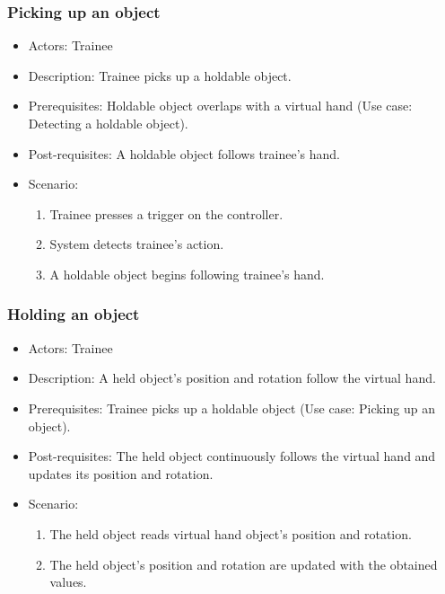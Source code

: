 \subsubsection{Picking up an object}
\begin{itemize}
\item Actors: Trainee
\item Description: Trainee picks up a holdable object.
\item Prerequisites: Holdable object overlaps with a virtual hand (Use case: Detecting a holdable object).
\item Post-requisites: A holdable object follows trainee's hand.
\item Scenario: 
\begin{enumerate}
    \item Trainee presses a trigger on the controller.
    \item System detects trainee's action.
    \item A holdable object begins following trainee's hand.
\end{enumerate}

\end{itemize}
\subsubsection{Holding an object}
\begin{itemize}
\item Actors: Trainee
\item Description: A held object's position and rotation follow the virtual hand.
\item Prerequisites: Trainee picks up a holdable object (Use case: Picking up an object).
\item Post-requisites: The held object continuously follows the virtual hand and updates its position and rotation.
\item Scenario: 
\begin{enumerate}
    \item The held object reads virtual hand object's position and rotation.
    \item The held object's position and rotation are updated with the obtained values.
\end{enumerate}
\end{itemize}

